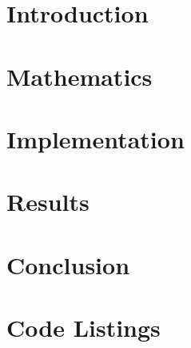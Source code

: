 \section{Introduction}

\iffalse
Interesting, cogent account of the work in this report
> in the context of the mathematical problem considered 
> in the scientific computing more widely
Very well referenced.

Talk about the problems we are going to discuss
> Laplacian operator. Finite difference of the finite difference of Laplace
> How do we get the matrix?
> Both for 1 and 2D.

Top 10 algorithms 20th century. How does it relate to wider mathematical community?

\fi


\section{Mathematics}

\iffalse
CG discussion:

Main algorithm
Mathematics of the mechanism
Preconditioning
Limitations of the algorithm
How do we get good/bad convergence?
Proof of convergence
Proof of complexity
\fi


\section{Implementation}

\iffalse
Implementation discussion:

Better band storage for wide bands with lots of zeros. Store the nonzeros with their locations.
Better interaction with the program for inputting data or getting results. Use of a scripting language and parser. 
Should treat vectors as matrices, reduces number of classes, fewer bugs and easier implementation.
Sparse matrices
Parallelisation and optimisation.
Unit tests
Error handling
\fi


\section{Results}

\iffalse
Results:
Graphs, errors, convergence rates,
\fi


\section{Conclusion}



\clearpage
\appendix
\section{Code Listings}
